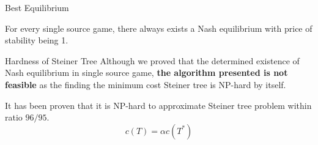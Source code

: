 \documentclass[11pt,aspectratio=169]{beamer}
\begin{document}


    

\begin{frame}{Best Equilibrium}
    \begin{theorem}
        For every single source game, there always exists a Nash equilibrium with price of stability being 1.
    \end{theorem}
\end{frame}

\begin{frame}{Hardness of Steiner Tree}
    Although we proved that the determined existence of Nash equilibrium in single source game, \textbf{the algorithm presented is not feasible} as the finding the minimum cost Steiner tree is NP-hard by itself. \\
    \vspace{10pt}

    It has been proven that it is NP-hard to approximate Steiner tree problem within ratio \(96/95\). \\
    \begin{equation*}
        c(T) = \alpha c(T^*)
    \end{equation*}
   
\end{frame}
\end{document}

